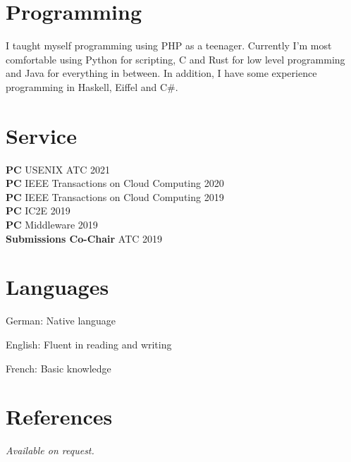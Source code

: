 \documentclass[margin,line]{cv/cv}
\begin{document}
\begin{resume}
    \section{\mysidestyle Programming}

    I taught myself programming using PHP as a teenager. Currently I'm most
    comfortable using Python for scripting, C and Rust for low level programming and
    Java for everything in between. In addition, I have some experience programming
    in Haskell, Eiffel and C\#.


    \section{\mysidestyle Service}
    \textbf{PC} USENIX ATC 2021 \\%
    \textbf{PC} IEEE Transactions on Cloud Computing 2020 \\%
    \textbf{PC} IEEE Transactions on Cloud Computing 2019 \\%
    \textbf{PC} IC2E 2019 \\%
    \textbf{PC} Middleware 2019 \\%
    \textbf{Submissions Co-Chair} ATC 2019 \\%


    \section{\mysidestyle Languages}
    \begin{list2}
        \item German: Native language
        \item English: Fluent in reading and writing
        \item French: Basic knowledge
    \end{list2}\vspace{-1.5mm}


    \section{\mysidestyle References}
     {\sl Available on request.}


\end{resume}
\end{document}
